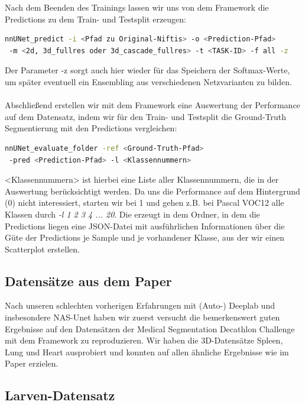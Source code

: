 Nach dem Beenden des Trainings lassen wir uns von dem Framework die Predictions zu dem Train- und Testsplit erzeugen:
\begin{lstlisting}[language=bash]
nnUNet_predict -i <Pfad zu Original-Niftis> -o <Prediction-Pfad>
 -m <2d, 3d_fullres oder 3d_cascade_fullres> -t <TASK-ID> -f all -z
\end{lstlisting}
Der Parameter -z sorgt auch hier wieder für das Speichern der Softmax-Werte, um später eventuell ein Ensembling aus verschiedenen Netzvarianten zu bilden.\\\\
Abschließend erstellen wir mit dem Framework eine Auswertung der Performance auf dem Datensatz, indem wir für den Train- und Testsplit die Ground-Truth Segmentierung mit den Predictions vergleichen:
\begin{lstlisting}[language=bash]
nnUNet_evaluate_folder -ref <Ground-Truth-Pfad>
 -pred <Prediction-Pfad> -l <Klassennummern>
\end{lstlisting}
<Klassennummern> ist hierbei eine Liste aller Klassennummern, die in der Auswertung berücksichtigt werden. Da uns die Performance auf dem Hintergrund (0) nicht interessiert, starten wir bei 1 und gehen z.B. bei Pascal VOC12 \cite{PascalVOCDatensatz} alle Klassen durch \textit{-l 1 2 3 4 ... 20}. Die erzeugt in dem Ordner, in dem die Predictions liegen eine JSON-Datei mit ausführlichen Informationen über die Güte der Predictions je Sample und je vorhandener Klasse, aus der wir einen Scatterplot erstellen.




\subsection{Datensätze aus dem Paper}
Nach unseren schlechten vorherigen Erfahrungen mit (Auto-) Deeplab \cite{deeplabGithub} und insbesondere NAS-Unet \cite{nasunetGithub} haben wir zuerst versucht die bemerkenswert guten Ergebnisse \parencite[Kapitel 4, Table 2]{nnunetPaper} auf den Datensätzen der Medical Segmentation Decathlon Challenge \cite{msdChallenge} mit dem Framework zu reproduzieren. Wir haben die 3D-Datensätze Spleen, Lung und Heart \cite{msdChallenge} ausprobiert und konnten auf allen ähnliche Ergebnisse wie im Paper erzielen.\\

\subsection{Larven-Datensatz}

